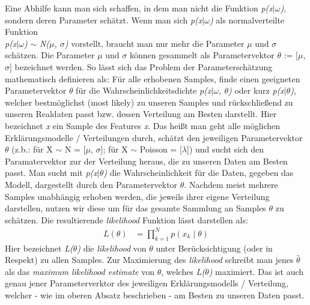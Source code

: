 Eine Abhilfe kann man sich schaffen, in dem man nicht die Funktion \textit{p(x$\mid$$\omega$)}, sondern deren Parameter schätzt. 
Wenn man sich \textit{p(x$\mid$$\omega$)} als normalverteilte Funktion \\
\textit{p(x$\mid$$\omega$)} $\sim$ \textit{N($\mu$, $\sigma$)} vorstellt, braucht man nur mehr die Parameter \textit{$\mu$} und \textit{$\sigma$} schätzen.
Die Parameter \textit{$\mu$} und \textit{$\sigma$} können gesammelt als Parametervektor $\theta$ := [\textit{$\mu$}, \textit{$\sigma$}] bezeichnet werden. 
So lässt sich das Problem der Parameterschätzung mathematisch definieren als: 
Für alle erhobenen Samples, finde einen geeigneten Parametervektor $\theta$ für die Wahrscheinlichkeitsdichte \textit{p(x$\mid$$\omega$, $\theta$)} oder kurz
\textit{p(x$\mid$$\theta$)}, welcher bestmöglichst (most likely) zu unseren Samples und rückschließend zu unseren Realdaten passt bzw. dessen Verteilung am Besten darstellt. 
Hier bezeichnet \textit{x} ein Sample des Features \textit{x}. Das heißt man geht alle möglichen Erklärungsmodelle / Verteilungen durch, schätzt den jeweiligen Parametervektor $\theta$ 
(z.b.: für X $\sim$ N = [$\mu$, $\sigma$]; für X $\sim$ Poisson = [$\lambda$]) und sucht sich den Paramatervektor zur der Verteilung heraus, die zu unseren Daten am Besten passt. 
Man sucht mit \textit{p(x$\mid$$\theta$)} die Wahrscheinlichkeit für die Daten, gegeben das Modell, dargestellt durch den Parametervektor $\theta$.
Nachdem meist mehrere Samples unabhängig erhoben werden, die jeweils ihrer eigene 
Verteilung darstellen, nutzen wir diese um für das gesamte Sammlung an Samples \textit{$\theta$} zu schätzen. Die resultierende \textit{likelihood} Funktion lässt darstellen als:
\begin{align}
	L(\theta) &= \prod_{k=1}^N p(x_k\mid\theta)
\end{align}
Hier bezeichnet \textit{L($\theta$)} die \textit{likelihood} von $\theta$ unter Berücksichtigung (oder in Respekt) zu allen Samples.
Zur Maximierung des \textit{likelihood} schreibt man jenes $\hat\theta$ als das \textit{maximum likelihood estimate} von $\theta$, welches \textit{L($\theta$)} maximiert.
Das ist auch genau jener Parameterverktor des jeweiligen Erklärungsmodells / Verteilung, welcher - wie im oberen Absatz beschrieben - am Besten zu unseren Daten passt. 


